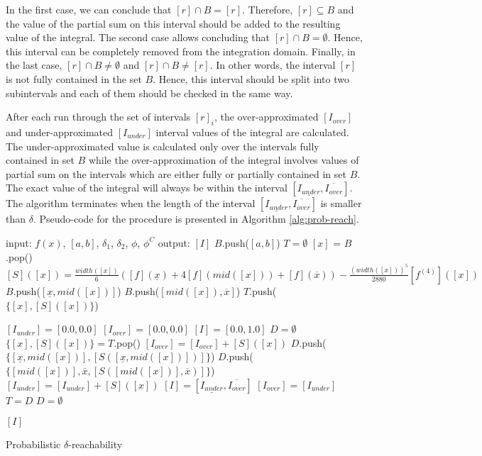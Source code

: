In the first case, we can conclude that $[r] \cap B = [r]$. Therefore, $[r] \subseteq B$ and 
the value of the partial sum on this interval should be added to the resulting value of the 
integral. The second case allows concluding that $[r] \cap B = \emptyset$. Hence, this interval 
can be completely removed from the integration domain. Finally, in the last case, 
$[r] \cap B \ne \emptyset$ and $[r] \cap B \ne [r]$. In other words, the interval $[r]$ is not 
fully contained in the set $B$. Hence, this interval should be split into two subintervals and 
each of them should be checked in the same way.

After each run through the set of intervals $[r]_{i}$, the over-approximated $[I_{over}]$ and 
under-approximated $[I_{under}]$ interval values of the integral are calculated. The 
under-approximated value is calculated only over the intervals fully contained in set $B$ 
while the over-approximation of the integral involves values of partial sum on the intervals 
which are either fully or partially contained in set $B$. The exact value of the integral will 
always be within the interval $[\underline{I_{under}}, \overline{I_{over}}]$. The algorithm 
terminates when the length of the interval $[\underline{I_{under}}, \overline{I_{over}}]$ is 
smaller than $\delta$. Pseudo-code for the procedure is presented in Algorithm \ref{alg:prob-reach}.
\begin{algorithm}
\label{alg:prob-reach}
input: $f(x)$, $[a, b]$, $\delta_{1}$, $\delta_{2}$, $\phi$, $\phi^C$\;
output: $[I]$\;
$B$.push($[a, b]$)\;
$T = \emptyset$\;
{
	$[x]$ = $B$.pop()\;
	$[S]([x]) = \frac{width([x])}{6}([f](\underline{x}) + 4 [f](mid([x])) + [f](\overline{x})) - \frac{(width([x]))^5}{2880}[f^{(4)}]([x])$\;
	{
		$B$.push($[\underline{x}, mid([x])]$)\;
		$B$.push($[mid([x]), \overline{x}]$)\;
	}\Else
	{
		$T$.push($\{[x], [S]([x])\}$)\;
	}
}

$[I_{under}] = [0.0, 0.0]$\;
$[I_{over}] = [0.0, 0.0]$\;
$[I] = [0.0, 1.0]$\;
$D = \emptyset$\;
{
	{
	$\{[x], [S]([x])\} = T$.pop()\;
	\If{$\phi([x])$}
	{
		$[I_{over}] = [I_{over}] + [S]([x])$\;
		{
			$D$.push($\{[\underline{x}, mid([x])], [S([\underline{x}, mid([x])])]\}$)\;
			$D$.push($\{[mid([x])], \overline{x}, [S([mid([x])], \overline{x})]\}$)\;
		}\Else
		{
			$[I_{under}] = [I_{under}] + [S]([x])$\;
		}
	}
	$[I] = [\underline{I_{under}}, \overline{I_{over}}]$\;
	$[I_{over}] = [I_{under}]$\;
	$T = D$\;
	$D = \emptyset$\;	
	}
}

\Return $[I]$\;

\caption{Probabilistic $\delta$-reachability}
\end{algorithm}
